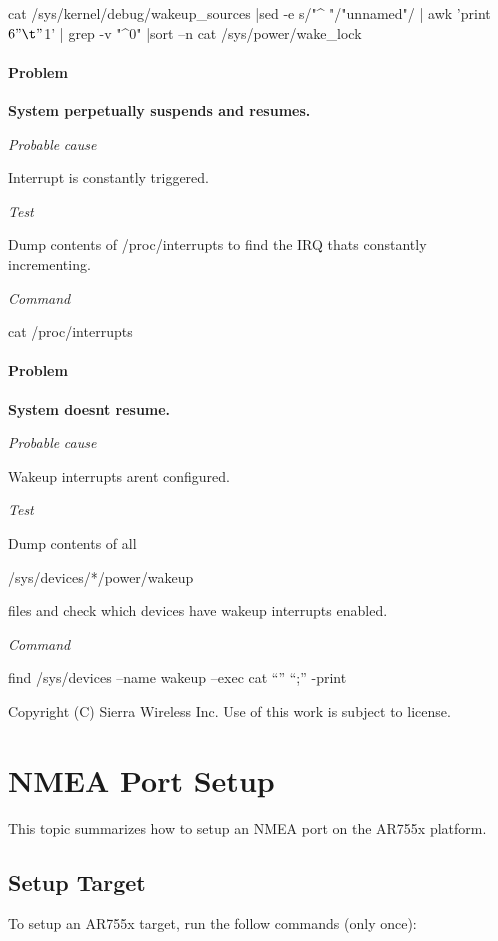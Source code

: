 \begin{DoxyVerb} cat /sys/kernel/debug/wakeup_sources |sed -e s/"^       "/"unnamed"/ | awk '{print $6 "\t" $1}' | grep -v "^0" |sort –n
 cat /sys/power/wake_lock
\end{DoxyVerb}


\paragraph*{Problem }

{\bfseries System perpetually suspends and resumes. }

{\itshape Probable} {\itshape cause} 

Interrupt is constantly triggered.

{\itshape Test} 

Dump contents of {\ttfamily /proc/interrupts} to find the I\+R\+Q that\textquotesingle{}s constantly incrementing.

{\itshape Command} 

{\ttfamily cat} /proc/interrupts

\paragraph*{Problem }

{\bfseries System doesn\textquotesingle{}t resume. }

{\itshape Probable} {\itshape cause} 

Wakeup interrupts aren\textquotesingle{}t configured.

{\itshape Test} 

Dump contents of all\begin{DoxyVerb}/sys/devices/*/power/wakeup \end{DoxyVerb}
 files and check which devices have wakeup interrupts enabled.

{\itshape Command} 

\begin{DoxyVerb}find /sys/devices –name wakeup –exec cat “{}” “;” -print \end{DoxyVerb}






Copyright (C) Sierra Wireless Inc. Use of this work is subject to license. \hypertarget{howToNMEA}{}\section{N\+M\+E\+A Port Setup}\label{howToNMEA}
This topic summarizes how to setup an N\+M\+E\+A port on the A\+R755x platform.\hypertarget{how_to_n_m_e_a_howToNMEA_setup}{}\subsection{Setup Target}\label{how_to_n_m_e_a_howToNMEA_setup}
To setup an A\+R755x target, run the follow commands (only once)\+:


